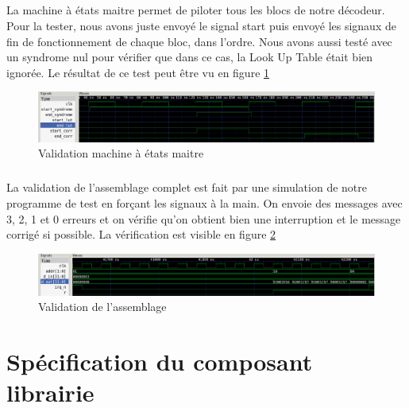 \documentclass[a4paper, 11pt, svgnames]{report}
\begin{document}
            \paragraph{}
                La machine à états maitre permet de piloter tous les blocs de notre décodeur.
                Pour la tester, nous avons juste envoyé le signal start puis
                envoyé les signaux de fin de fonctionnement de chaque bloc,
                dans l'ordre. Nous avons aussi testé avec un syndrome nul pour vérifier
                que dans ce cas, la Look Up Table était bien ignorée.
                Le résultat de ce test peut être vu en figure \ref{fig:sim_master}
                \begin{figure}[H]
                    \centering
                    \includegraphics[width=\textwidth]{./images/master_simu}
                    \caption{Validation machine à états maitre}
                    \label{fig:sim_master}
                \end{figure}

            \paragraph{}
                La validation de l'assemblage complet est fait par une
                simulation de notre programme de test en forçant les signaux à
                la main.  On envoie des messages avec 3, 2, 1 et 0 erreurs et
                on vérifie qu'on obtient bien une interruption et le message
                corrigé si possible.  La vérification est visible en figure
                \ref{fig:sim_bch}

                \begin{figure}[H]
                    \centering
                    \includegraphics[width=\textwidth]{./images/bch_simu}
                    \caption{Validation de l'assemblage}
                    \label{fig:sim_bch}
                \end{figure}

    \chapter{Spécification du composant librairie}
\end{document}
